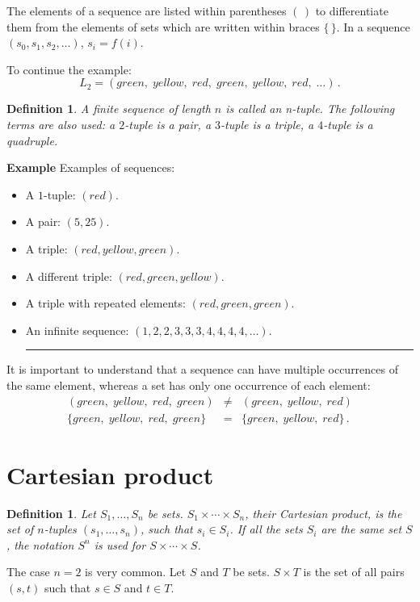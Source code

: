 \documentclass[12pt,a4paper]{article}
\newtheorem{definition}[theorem]{Definition}
\newcommand*{\qed}{\hfill\rule[-2pt]{4pt}{10pt}}
\newenvironment{example}{\textbf{Example}}{}
\begin{document}
The elements of a sequence are listed within parentheses $(\,)$ to differentiate them from the elements of sets which are written within braces $\{\,\}$. In a sequence $(s_0, s_1, s_2, \ldots)$, $s_i=f(i)$.

To continue the example:
\[
L_2=(\mathit{green},\; \mathit{yellow},\; \mathit{red},\; \mathit{green},\; \mathit{yellow},\; \mathit{red},\; \ldots)\,.
\]

\begin{definition}
A finite sequence of length $n$ is called an \emph{n-tuple}. The
following terms are also used: a $2$-tuple is a \emph{pair}, a $3$-tuple
is a \emph{triple}, a $4$-tuple is a \emph{quadruple}.
\end{definition}

\begin{example} Examples of sequences:
\begin{itemize}
\item A $1$-tuple: $(\mathit{red})$.
\item A pair: $(5, 25)$.
\item A triple: $(\mathit{red}, \mathit{yellow}, \mathit{green})$.
\item A different triple: $(\mathit{red}, \mathit{green}, \mathit{yellow})$.
\item A triple with repeated elements: $(\mathit{red}, \mathit{green}, \mathit{green})$.
\item An infinite sequence: $(1, 2, 2, 3, 3, 3, 4, 4, 4, 4, \ldots)$.\qed
\end{itemize}
\end{example}
It is important to understand that a sequence can have multiple occurrences of the same element, whereas a set has only one occurrence of each element:
\begin{eqnarray*}
(\mathit{green},\; \mathit{yellow},\; \mathit{red},\; \mathit{green})&\neq& (\mathit{green},\; \mathit{yellow},\; \mathit{red})\\
\{\mathit{green},\; \mathit{yellow},\; \mathit{red},\; \mathit{green}\}&=& \{\mathit{green},\; \mathit{yellow},\; \mathit{red}\}\,.
\end{eqnarray*}

\section{Cartesian product}
\begin{definition}
Let $S_{1}, \ldots, S_{n}$ be sets. $S_{1}\times\cdots\times S_{n}$, their \emph{Cartesian product}, is the set of $n$-tuples $(s_1,\ldots,s_n)$, such that $s_i\in S_{i}$. If all the sets $S_{i}$ are the same set $S$, the notation $S^{n}$ is used for $S\times\cdots\times S$.
\end{definition}
The case $n=2$  is very common. Let $S$ and $T$ be sets. $S\times T$ is the set of all pairs $(s,t)$ such that $s\in S$ and $t\in T$.
\end{document}
